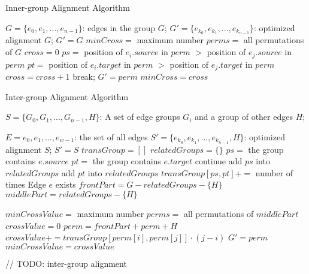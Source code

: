 \documentclass{article}
\begin{document}
\begin{algorithm}[h]
	\caption{Inner-group Alignment Algorithm}
	\label{alg::innergroup}
	\begin{algorithmic}[1]
		\Require
		$G = \{e_0, e_1, ..., e_{n-1}\}$: edges in the group $G$;
		\Ensure
		$G' = \{e_{k_0}, e_{k_1}, ..., e_{k_{n-1}}\}$: optimized alignment $G$;
			\State $G' = G$
		\Else
				\State $minCross = $ maximum number
				\State $perms = $ all permutations of $G$
					\State $cross = 0$
								\State $ps = $ position of $e_i.source$ in $perm$ $>$ position of $e_j.source$ in $perm$
								\State $pt = $ position of $e_i.target$ in $perm$ $>$ position of $e_j.target$ in $perm$
									\State $cross = cross+1 $
								\EndIf
							\EndIf
						\EndFor					
					\EndFor
							\State break;
						\EndIf
						\State $G' = perm$
						\State $minCross = cross$
					\EndIf
				\EndFor
		\EndIf
	\end{algorithmic}
\end{algorithm}


\begin{algorithm}[h]
	\caption{Inter-group Alignment Algorithm}
	\label{alg::intergroup}
	\begin{algorithmic}[1]
		\Require
		$S = \{G_0, G_1, ..., G_{n-1}, H\}$: A set of edge groups $G_i$ and a group of other edges $H$;
		
		$E = {e_0, e_1, \dots, e_{w-1}}$: the set of all edges
		\Ensure
		$S' = \{e_{k_0}, e_{k_1}, ..., e_{k_{n-1}}, H\}$: optimized alignment $S$;
			\State $S' = S$
		\Else
			\State $transGroup = []$
			\State $relatedGroups = \{\}$
				\State $ps = $ the group contains $e.source$
				\State $pt = $ the group contains $e.target$
					\State continue
				\EndIf
					\State add $ps$ into $relatedGroups$
				\EndIf
					\State add $pt$ into $relatedGroups$
				\EndIf
				\State $transGroup[ps,pt] += $ number of times Edge $e$ exists
			\EndFor
			\State $frontPart = G - relatedGroups- \{H\}$
			\State $middlePart = relatedGroups- \{H\}$
			
			
\State $minCrossValue = $ maximum number
\State $perms = $ all permutations of $middlePart$
	\State $crossValue = 0$
	\State $perm = frontPart + perm + {H}$
			\State $crossValue += transGroup[perm[i],perm[j]] \cdot (j-i)$
		\EndFor					
	\EndFor
		\State $G' = perm$
		\State $minCrossValue = crossValue$
	\EndIf
\EndFor
			
		\EndIf
	\end{algorithmic}
\end{algorithm}



// TODO: inter-group alignment
\end{document}
